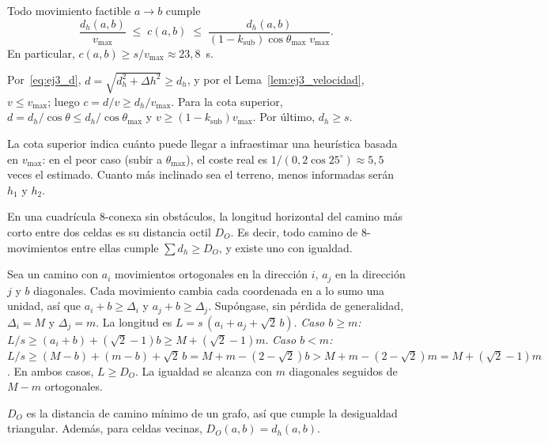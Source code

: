 \begin{lema}
\label{lem:ej3_cota_coste}
Todo movimiento factible $a \to b$ cumple
\begin{equation}
  \frac{d_h(a,b)}{v_{\max}} \;\le\; c(a,b) \;\le\;
  \frac{d_h(a,b)}{(1 - k_{\mathrm{sub}})\cos\theta_{\max}\; v_{\max}}.
  \label{eq:ej3_cotas_coste}
\end{equation}
En particular, $c(a,b) \ge s / v_{\max} \approx 23{,}8$~s.
\end{lema}
\begin{IEEEproof}
Por~\eqref{eq:ej3_d}, $d = \sqrt{d_h^2 + \Delta h^2} \ge d_h$, y por el
Lema~\ref{lem:ej3_velocidad}, $v \le v_{\max}$; luego
$c = d/v \ge d_h / v_{\max}$. Para la cota superior,
$d = d_h / \cos\theta \le d_h / \cos\theta_{\max}$ y
$v \ge (1 - k_{\mathrm{sub}})v_{\max}$. Por último, $d_h \ge s$.
\end{IEEEproof}

La cota superior indica cuánto puede llegar a infraestimar una heurística
basada en $v_{\max}$: en el peor caso (subir a $\theta_{\max}$), el coste
real es $1/(0{,}2 \cos 25^\circ) \approx 5{,}5$ veces el estimado. Cuanto
más inclinado sea el terreno, menos informadas serán $h_1$ y $h_2$.

\begin{lema}
\label{lem:ej3_octil}
En una cuadrícula 8-conexa sin obstáculos, la longitud horizontal del camino
más corto entre dos celdas es su distancia octil $D_O$. Es decir, todo
camino de 8-movimientos entre ellas cumple $\sum d_h \ge D_O$, y existe uno
con igualdad.
\end{lema}
\begin{IEEEproof}
Sea un camino con $a_i$ movimientos ortogonales en la dirección $i$, $a_j$ en
la dirección $j$ y $b$ diagonales. Cada movimiento cambia cada coordenada en
a lo sumo una unidad, así que $a_i + b \ge \Delta_i$ y
$a_j + b \ge \Delta_j$. Supóngase, sin pérdida de generalidad,
$\Delta_i = M$ y $\Delta_j = m$. La longitud es
$L = s\,(a_i + a_j + \sqrt{2}\,b)$.
\emph{Caso $b \ge m$:}
$L/s \ge (a_i + b) + (\sqrt{2} - 1)b \ge M + (\sqrt{2} - 1)m$.
\emph{Caso $b < m$:}
$L/s \ge (M - b) + (m - b) + \sqrt{2}\,b = M + m - (2 - \sqrt{2})b
> M + m - (2 - \sqrt{2})m = M + (\sqrt{2} - 1)m$.
En ambos casos, $L \ge D_O$. La igualdad se alcanza con $m$ diagonales
seguidos de $M - m$ ortogonales.
\end{IEEEproof}

\begin{corolario}
\label{cor:ej3_octil}
$D_O$ es la distancia de camino mínimo de un grafo, así que cumple la
desigualdad triangular. Además, para celdas vecinas,
$D_O(a,b) = d_h(a,b)$.
\end{corolario}

